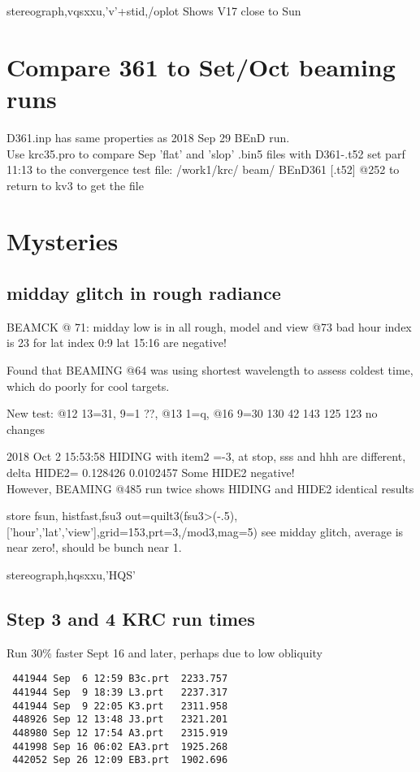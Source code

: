 \documentclass{article}
\begin{document}
stereograph,vqsxxu,'v'+stid,/oplot  Shows V17 close to Sun

\section{Compare 361 to Set/Oct beaming runs}
D361.inp has same properties as 2018 Sep 29 BEnD run. 
\\ Use krc35.pro to compare Sep 'flat' and 'slop' .bin5 files  with D361-.t52
\qi set parf 11:13 to the convergence test file: /work1/krc/ beam/ BEnD361 [.t52]
\qi @252 to return to kv3 to get the file
\qi 



\section{Mysteries}
\subsection{midday glitch in rough radiance}
BEAMCK @ 71:  midday low is in all rough, model and view
\qi @73  bad hour index is 23 for lat index 0:9   lat 15:16 are negative!

Found that BEAMING @64 was using shortest wavelength to assess coldest time, which  do poorly for cool targets. 


New test: @12 13=31, 9=1 ??,  @13 1=q,    @16 9=30 
130 42  143  125 123 no changes


2018 Oct 2 15:53:58  HIDING with item2 =-3, at stop, sss and hhh are different, 
\qi delta HIDE2=     0.128426    0.0102457   Some HIDE2 negative!
\\ However, BEAMING @485 run twice shows HIDING and HIDE2  identical results

store fsun,
 histfast,fsu3
 out=quilt3(fsu3>(-.5),['hour','lat','view'],grid=153,prt=3,/mod3,mag=5)
 see midday glitch, average is near zero!, should be bunch near 1.

stereograph,hqsxxu,'HQS'  
\subsection{Step 3 and 4 KRC run times}
Run 30\% faster Sept 16 and later, perhaps due to low obliquity
\begin{verbatim}
 441944 Sep  6 12:59 B3c.prt  2233.757
 441944 Sep  9 18:39 L3.prt   2237.317 
 441944 Sep  9 22:05 K3.prt   2311.958
 448926 Sep 12 13:48 J3.prt   2321.201
 448980 Sep 12 17:54 A3.prt   2315.919
 441998 Sep 16 06:02 EA3.prt  1925.268
 442052 Sep 26 12:09 EB3.prt  1902.696
\end{verbatim}  
\end{document}
